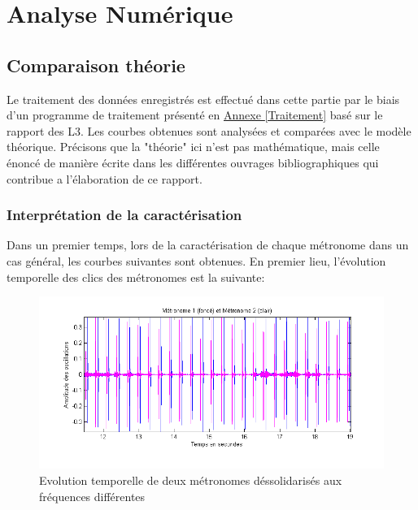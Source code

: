 \documentclass[a4paper,11pt]{report}
\begin{document}
 

\chapter{Analyse Numérique}
\section{Comparaison théorie}
Le traitement des données enregistrés est effectué dans cette partie par le biais d'un programme de traitement présenté en \underline{Annexe \ref{Traitement}} basé sur le rapport des L3\cite{ram}. Les courbes obtenues sont analysées et comparées avec le modèle théorique. Précisons que la "théorie" ici n'est pas mathématique, mais celle énoncé de manière écrite dans les différentes ouvrages bibliographiques qui contribue a l'élaboration de ce rapport.
\subsection{Interprétation de la caractérisation}
Dans un premier temps, lors de la caractérisation de chaque métronome dans un cas général, les courbes suivantes sont obtenues. En premier lieu, l'évolution temporelle des clics des métronomes est la suivante:
\begin{figure}[h]
\centering
\includegraphics[width=1\textwidth]{Caracterisation_temporelle_200BPM}
\caption{Evolution temporelle de deux métronomes déssolidarisés aux fréquences différentes}\label{CaractérisationT}
\end{figure}\\
\end{document}
